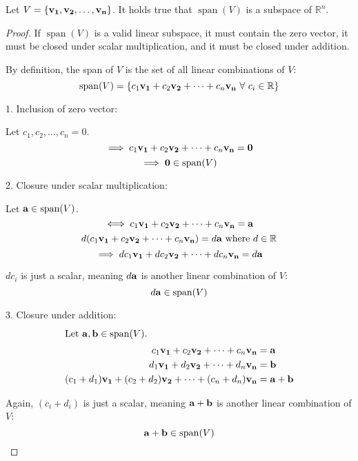 \documentclass[../main.tex]{subfiles}
\begin{document}
\begin{theorem}
	Let $V=\{ \mathbf{v_1}, \mathbf{v_2}, \ldots , \mathbf{v_n} \}$. It holds true that
	$\operatorname{span}(V)$ is a subspace of $\mathbb{R}^n$.
\end{theorem}

\begin{proof}
	If $\operatorname{span}(V)$ is a valid linear subspace, it must contain the zero vector,
	it must be closed under scalar multiplication, and it must be closed
	under addition.

	By definition, the span of $V$ is the set of all linear combinations of $V$:
	\begin{equation*}
		\operatorname{span}(V)=\{ c_1\mathbf{v_1} + c_2\mathbf{v_2} + \dots + c_n\mathbf{v_n}\ \forall\ c_i \in \mathbb{R} \}
	\end{equation*}

	1. Inclusion of zero vector:
	\begin{center}
		Let $c_1, c_2, \ldots , c_n=0$.
		$$\implies c_1\mathbf{v_1} + c_2\mathbf{v_2} + \dots + c_n\mathbf{v_n}=\mathbf{0}$$
		$$\implies \mathbf{0} \in \operatorname{span}(V)$$
	\end{center}

	2. Closure under scalar multiplication:
	\begin{center}
		Let $\mathbf{a} \in \operatorname{span}(V)$.
		$$\iff c_1\mathbf{v_1} + c_2\mathbf{v_2} + \dots + c_n\mathbf{v_n}=\mathbf{a}$$
		$$d(c_1\mathbf{v_1} + c_2\mathbf{v_2} + \dots + c_n\mathbf{v_n})=d\mathbf{a}\ \textnormal{where}\ d \in \mathbb{R}$$
		$$\implies dc_1\mathbf{v_1} + dc_2\mathbf{v_2} + \dots + dc_n\mathbf{v_n}=d\mathbf{a}$$
	\end{center}

	$dc_i$ is just a scalar, meaning $d\mathbf{a}$ is another
	linear combination of $V$:
	$$d\mathbf{a} \in \operatorname{span}(V)$$

	3. Closure under addition:
	\begin{align*}
		\intertext{Let $\mathbf{a}, \mathbf{b} \in \operatorname{span}(V)$.}
		c_1\mathbf{v_1} + c_2\mathbf{v_2} + \dots + c_n\mathbf{v_n}                   & = \mathbf{a}            \\
		d_1\mathbf{v_1} + d_2\mathbf{v_2} + \dots + d_n\mathbf{v_n}                   & = \mathbf{b}            \\
		(c_1+d_1)\mathbf{v_1} + (c_2+d_2)\mathbf{v_2} + \dots + (c_n+d_n)\mathbf{v_n} & = \mathbf{a} + \mathbf{b}
	\end{align*}

	Again, $(c_i+d_i)$ is just a scalar, meaning $\mathbf{a}+\mathbf{b}$ is another linear combination of $V$:
	$$\mathbf{a}+\mathbf{b} \in \operatorname{span}(V)$$
\end{proof}
\end{document}
